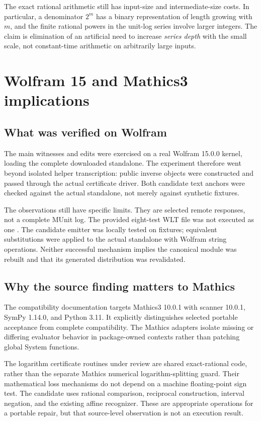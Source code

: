 \documentclass[11pt,letterpaper]{article}
\newcommand{\code}[1]{\texttt{\detokenize{#1}}}
\theoremstyle{remark}\newtheorem{remark}[proposition]{Remark}
\begin{document}
The exact rational arithmetic still has input-size and intermediate-size
costs. In particular, a denominator $2^{m}$ has a binary representation of
length growing with $m$, and the finite rational powers in the unit-log
series involve larger integers. The claim is elimination of an artificial
need to increase \emph{series depth} with the small scale, not constant-time
arithmetic on arbitrarily large inputs.

\section{Wolfram 15 and Mathics3 implications}
\subsection{What was verified on Wolfram}
The main witnesses and edits were exercised on a real Wolfram 15.0.0 kernel,
loading the complete downloaded standalone. The experiment therefore went
beyond isolated helper transcription: public inverse objects were constructed
and passed through the actual certificate driver. Both candidate text anchors
were checked against the actual standalone, not merely against synthetic
fixtures.

The observations still have specific limits. They are selected remote
responses, not a complete MUnit log. The provided eight-test WLT file was not
executed as one \code{TestReport}. The candidate emitter was locally tested
on fixtures; equivalent substitutions were applied to the actual standalone
with Wolfram string operations. Neither successful mechanism implies the
canonical module was rebuilt and that its generated distribution was
revalidated.

\subsection{Why the source finding matters to Mathics}
The compatibility documentation targets Mathics3 10.0.1 with scanner 10.0.1,
SymPy 1.14.0, and Python 3.11. It explicitly distinguishes selected portable
acceptance from complete compatibility. The Mathics adapters isolate missing
or differing evaluator behavior in package-owned contexts rather than
patching global System functions.\cite{mathicscompat,mathicssite}

The logarithm certificate routines under review are shared exact-rational
code, rather than the separate Mathics numerical logarithm-splitting guard.
Their mathematical loss mechanisms do not depend on a machine floating-point
sign test. The candidate uses rational comparison, reciprocal construction,
interval negation, and the existing affine recognizer. These are appropriate
operations for a portable repair, but that source-level observation is not an
execution result.
\end{document}
